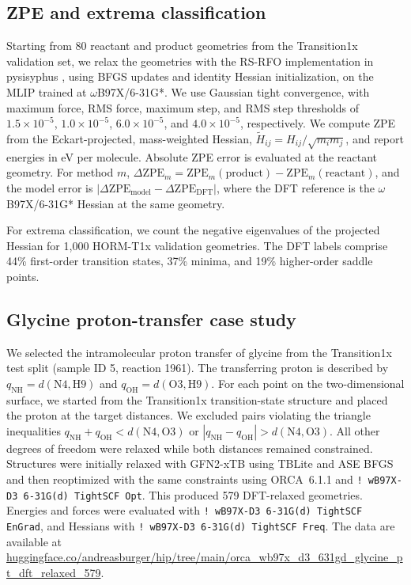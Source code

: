 \documentclass[pdflatex,sn-mathphys-num]{sn-jnl}%
\begin{document}
\subsection{ZPE and extrema classification}
Starting from 80 reactant and product geometries from the Transition1x validation set, we relax the geometries with the RS-RFO implementation in pysisyphus \citep{steinmetzer2021}, using BFGS updates and identity Hessian initialization, on the MLIP trained at $\omega$B97X/6-31G*. We use Gaussian tight convergence, with maximum force, RMS force, maximum step, and RMS step thresholds of \(1.5\times10^{-5}\), \(1.0\times10^{-5}\), \(6.0\times10^{-5}\), and \(4.0\times10^{-5}\), respectively. We compute ZPE from the Eckart-projected, mass-weighted Hessian, \(\tilde{H}_{ij}=H_{ij}/\sqrt{m_i m_j}\), and report energies in eV per molecule. Absolute ZPE error is evaluated at the reactant geometry. For method \(m\), \(\Delta\mathrm{ZPE}_m=\mathrm{ZPE}_m(\mathrm{product})-\mathrm{ZPE}_m(\mathrm{reactant})\), and the model error is \(\left|\Delta\mathrm{ZPE}_{\mathrm{model}}-\Delta\mathrm{ZPE}_{\mathrm{DFT}}\right|\), where the DFT reference is the $\omega$B97X/6-31G* Hessian at the same geometry.

For extrema classification, we count the negative eigenvalues of the projected Hessian for 1,000 HORM-T1x validation geometries. The DFT labels comprise 44\% first-order transition states, 37\% minima, and 19\% higher-order saddle points.

\subsection{Glycine proton-transfer case study}
We selected the intramolecular proton transfer of glycine from the Transition1x test split (sample ID 5, reaction 1961). The transferring proton is described by \(q_{\mathrm{NH}}=d(\mathrm{N4},\mathrm{H9})\) and \(q_{\mathrm{OH}}=d(\mathrm{O3},\mathrm{H9})\). For each point on the two-dimensional surface, we started from the Transition1x transition-state structure and placed the proton at the target distances. We excluded pairs violating the triangle inequalities \(q_{\mathrm{NH}}+q_{\mathrm{OH}}<d(\mathrm{N4},\mathrm{O3})\) or \(|q_{\mathrm{NH}}-q_{\mathrm{OH}}|>d(\mathrm{N4},\mathrm{O3})\). All other degrees of freedom were relaxed while both distances remained constrained. Structures were initially relaxed with GFN2-xTB using TBLite and ASE BFGS and then reoptimized with the same constraints using ORCA~6.1.1 \citep{ORCA} and \texttt{! wB97X-D3 6-31G(d) TightSCF Opt}. This produced 579 DFT-relaxed geometries. Energies and forces were evaluated with \texttt{! wB97X-D3 6-31G(d) TightSCF EnGrad}, and Hessians with \texttt{! wB97X-D3 6-31G(d) TightSCF Freq}. The data are available at \url{huggingface.co/andreasburger/hip/tree/main/orca_wb97x_d3_631gd_glycine_pt_dft_relaxed_579}.
\end{document}
